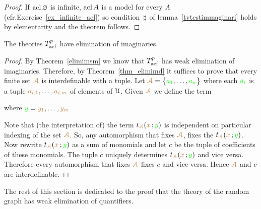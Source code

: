 \documentclass[creche.tex]{subfiles}
\begin{document}
\begin{proof}
If $\mathop{\rm acl}\varnothing$ is infinite, $\mathop{\rm acl} A$ is a model for every $A$ (cfr.\@ Exercise~\ref{ex_infinite_acl}) so condition $\,\sharp\,$ of lemma~\ref{tvtestimmaginari} holds by elementarity and the theorem follows.
\end{proof}


\begin{theorem}\label{elimimacf} 
The theories $T^p_{\rm acf}$ have elimination of imaginaries.
\end{theorem}

\begin{proof}
By Theorem~\ref{elimimsm} we know that $T^p_{\rm acf}$ has weak elimination of imaginaries.
Therefore, by Theorem~\ref{thm_elimimd} it suffices to prove that every finite set ${\color{brown}\EuScript A}$ is interdefinable with a tuple.
Let ${\color{brown}\EuScript A}=\big\{{\color{green} a_1},\dots,{\color{green} a_n}\big\}$ where each ${\color{green} a_i}$ is a tuple ${\color{brown} a_{i,1}},\dots,{\color{brown} a_{i,m}}$ of elements of $\EuScript U$.
Given ${\color{brown}\EuScript A}$ we define the term

\hfill where ${\color{green} y}={\color{brown} y_1},\dots,{\color{brown} y_m}$


Note that (the interpretation of) the term $t_{\color{brown}\EuScript A}({\color{brown} x}\,;{\color{green} y})$ is independent on particular indexing of the set ${\color{brown}\EuScript A}$.
So, any automorphism that fixes ${\color{brown}\EuScript A}$, fixes the  $t_{\color{brown}\EuScript A}({\color{brown} x}\,;{\color{green} y})$.
Now rewrite $t_{\color{brown}\EuScript A}({\color{brown} x}\,;{\color{green} y})$ as a sum of monomials and let $c$ be the tuple of coefficients of these monomials.
The tuple $c$ uniquely determines $t_{\color{brown}\EuScript A}({\color{brown} x}\,;{\color{green} y})$ and vice versa.
Therefore every automorphism that fixes  ${\color{brown}\EuScript A}$ fixes  $c$ and vice versa.
Hence  ${\color{brown}\EuScript A}$ and  $c$ are interdefinable.
\end{proof}

The rest of this section is dedicated to the proof that the theory of the random graph has weak elimination of quantifiers.
\end{document}
